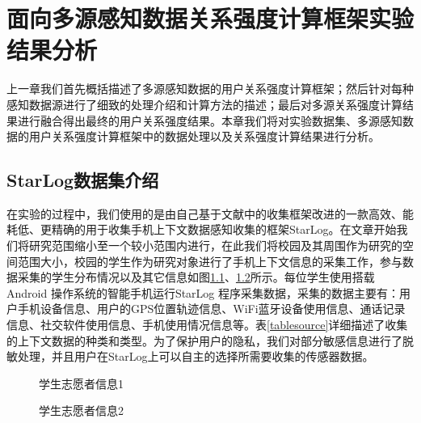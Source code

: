 \chapter{面向多源感知数据关系强度计算框架实验结果分析}
\label{chap:chapter03}
上一章我们首先概括描述了多源感知数据的用户关系强度计算框架；然后针对每种感知数据源进行了细致的处理介绍和计算方法的描述；最后对多源关系强度计算结果进行融合得出最终的用户关系强度结果。本章我们将对实验数据集、多源感知数据的用户关系强度计算框架中的数据处理以及关系强度计算结果进行分析。

\section{StarLog数据集介绍}
\label{sec:section5-1}
在实验的过程中，我们使用的是由自己基于文献\cite{rawassizadeh2013ubiqlog}中的收集框架改进的一款高效、能耗低、更精确的用于收集手机上下文数据感知收集的框架StarLog。在文章开始我们将研究范围缩小至一个较小范围内进行，在此我们将校园及其周围作为研究的空间范围大小，校园的学生作为研究对象进行了手机上下文信息的采集工作，参与数据采集的学生分布情况以及其它信息如图\ref{fig:stu_info1}、\ref{fig:stu_info2}所示。每位学生使用搭载Android 操作系统的智能手机运行StarLog 程序采集数据，采集的数据主要有：用户手机设备信息、用户的GPS位置轨迹信息、WiFi蓝牙设备使用信息、通话记录信息、社交软件使用信息、手机使用情况信息等。表\ref{tablesource}详细描述了收集的上下文数据的种类和类型。为了保护用户的隐私，我们对部分敏感信息进行了脱敏处理，并且用户在StarLog上可以自主的选择所需要收集的传感器数据。
\begin{figure}[htb]
  \centering%
  \hspace{4em}%
  \caption{学生志愿者信息1}
  \label{fig:stu_info1}
\end{figure}

\begin{figure}[htb]
  \centering%
  \hspace{4em}%
  \caption{学生志愿者信息2}
  \label{fig:stu_info2}
\end{figure}



